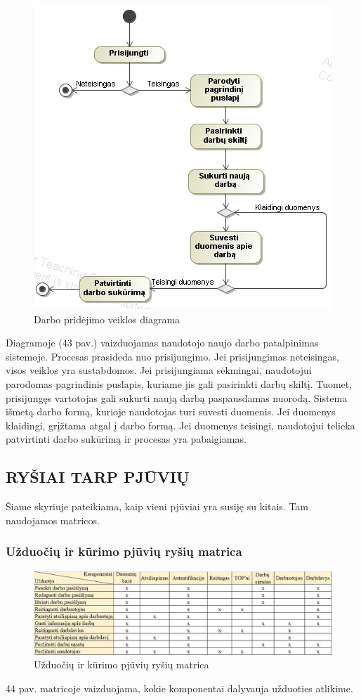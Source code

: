 \documentclass{VUMIFPSkursinis}
\begin{document}
\begin{figure}[H]
\centering
\includegraphics[scale=1, frame]{img/veiklos(pridetiDarba).png}
\caption{Darbo pridėjimo veiklos diagrama}
\end{figure}
Diagramoje (43 pav.) vaizduojamas naudotojo naujo darbo patalpinimas sistemoje. Procesas prasideda nuo prisijungimo. Jei prisijungimas neteisingas, visos veiklos yra sustabdomos. Jei prisijungiama sėkmingai, naudotojui parodomas pagrindinis puslapis, kuriame jis gali pasirinkti darbų skiltį. Tuomet, prisijungęs vartotojas gali sukurti naują darbą paspausdamas nuorodą. Sistema išmetą darbo formą, kurioje naudotojas turi suvesti duomenis. Jei duomenys klaidingi, grįžtama atgal į darbo formą. Jei duomenys teisingi, naudotojui telieka patvirtinti darbo sukūrimą ir procesas yra pabaigiamas.
\newpage
\subsection{RYŠIAI TARP PJŪVIŲ}
Šiame skyriuje pateikiama, kaip vieni pjūviai yra susiję su kitais. Tam naudojamos matricos.
\subsubsection{Užduočių ir kūrimo pjūvių ryšių matrica}
\begin{figure}[H]
\centering
\includegraphics[width=\linewidth, frame]{img/matricaUK.jpg}
\caption{Užduočių ir kūrimo pjūvių ryšių matrica}
\end{figure}
44 pav. matricoje vaizduojama, kokie komponentai dalyvauja užduoties atlikime.
\end{document}
